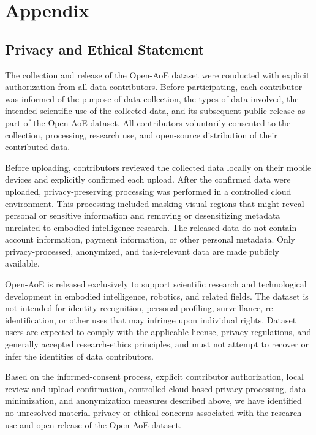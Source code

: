 \section*{Appendix}
\subsection*{Privacy and Ethical Statement}
\label{sec:privacy_ethics}

The collection and release of the Open-AoE dataset were conducted with explicit authorization from all data contributors. Before participating, each contributor was informed of the purpose of data collection, the types of data involved, the intended scientific use of the collected data, and its subsequent public release as part of the Open-AoE dataset. All contributors voluntarily consented to the collection, processing, research use, and open-source distribution of their contributed data.

Before uploading, contributors reviewed the collected data locally on their mobile devices and explicitly confirmed each upload. After the confirmed data were uploaded, privacy-preserving processing was performed in a controlled cloud environment. This processing included masking visual regions that might reveal personal or sensitive information and removing or desensitizing metadata unrelated to embodied-intelligence research. The released data do not contain account information, payment information, or other personal metadata. Only privacy-processed, anonymized, and task-relevant data are made publicly available.

Open-AoE is released exclusively to support scientific research and technological development in embodied intelligence, robotics, and related fields. The dataset is not intended for identity recognition, personal profiling, surveillance, re-identification, or other uses that may infringe upon individual rights. Dataset users are expected to comply with the applicable license, privacy regulations, and generally accepted research-ethics principles, and must not attempt to recover or infer the identities of data contributors.

Based on the informed-consent process, explicit contributor authorization, local review and upload confirmation, controlled cloud-based privacy processing, data minimization, and anonymization measures described above, we have identified no unresolved material privacy or ethical concerns associated with the research use and open release of the Open-AoE dataset.